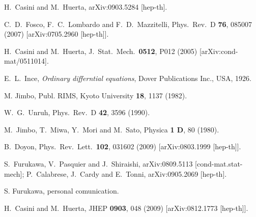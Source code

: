 \documentclass[11pt]{article}
\begin{document}
\begin{thebibliography}{99}
  H.~Casini and M.~Huerta,
  arXiv:0903.5284 [hep-th].


  C.~D.~Fosco, F.~C.~Lombardo and F.~D.~Mazzitelli,
  Phys.\ Rev.\  D {\bf 76}, 085007 (2007)
  [arXiv:0705.2960 [hep-th]].


  H.~Casini and M.~Huerta,
  J.\ Stat.\ Mech.\  {\bf 0512}, P012 (2005)
  [arXiv:cond-mat/0511014].

 E.~L.~Ince, {\sl Ordinary differntial equations}, Dover Publications Inc., USA, 1926.

 M. Jimbo, Publ. RIMS, Kyoto University  {\bf 18}, 1137 (1982).

  W.~G.~Unruh,
  Phys.\ Rev.\  D {\bf 42}, 3596 (1990).





  M.~Jimbo, T.~Miwa, Y.~Mori and M.~Sato,
Physica  {\bf 1 D}, 80 (1980).

  B.~Doyon,
  Phys.\ Rev.\ Lett.\  {\bf 102}, 031602 (2009)
  [arXiv:0803.1999 [hep-th]].

  S.~Furukawa, V.~Pasquier and J.~Shiraishi,
  arXiv:0809.5113 [cond-mat.stat-mech]; 
  P.~Calabrese, J.~Cardy and E.~Tonni,
  arXiv:0905.2069 [hep-th].

S. Furukawa, personal comunication. 

  H.~Casini and M.~Huerta,
  JHEP {\bf 0903}, 048 (2009)
  [arXiv:0812.1773 [hep-th]].



\end{thebibliography}
\end{document}
